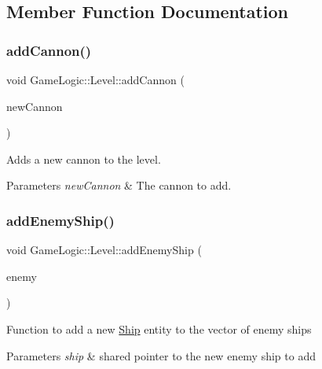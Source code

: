 \subsection{Member Function Documentation}
\mbox{\label{classGameLogic_1_1Level_a728ab647770a64be071d4125d7bd5cd6}} 
\subsubsection{\texorpdfstring{add\+Cannon()}{addCannon()}}
{\footnotesize\ttfamily void Game\+Logic\+::\+Level\+::add\+Cannon (\begin{DoxyParamCaption}\item[{shared\+\_\+ptr$<$ \hyperlink{classGameLogic_1_1EnergyCannon}{Energy\+Cannon} $>$}]{new\+Cannon }\end{DoxyParamCaption})}

Adds a new cannon to the level. 
\begin{DoxyParams}{Parameters}
{\em new\+Cannon} & The cannon to add. \\
\hline
\end{DoxyParams}
\mbox{\label{classGameLogic_1_1Level_a4d6e8cd499b0d78a36f7a2f89f221456}} 
\subsubsection{\texorpdfstring{add\+Enemy\+Ship()}{addEnemyShip()}}
{\footnotesize\ttfamily void Game\+Logic\+::\+Level\+::add\+Enemy\+Ship (\begin{DoxyParamCaption}\item[{shared\+\_\+ptr$<$ \hyperlink{classGameLogic_1_1BasicEnemy}{Basic\+Enemy} $>$}]{enemy }\end{DoxyParamCaption})}

Function to add a new \hyperlink{classGameLogic_1_1Ship}{Ship} entity to the vector of enemy ships 
\begin{DoxyParams}{Parameters}
{\em ship} & shared pointer to the new enemy ship to add \\
\hline
\end{DoxyParams}
\mbox{\label{classGameLogic_1_1Level_a9945b2baf78f44ff61f189846cc59c7a}} 
